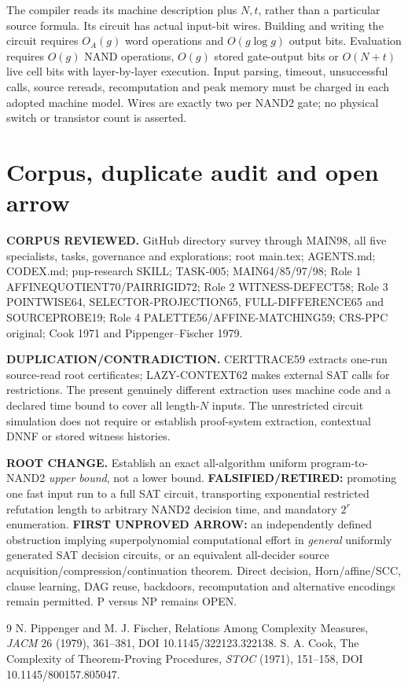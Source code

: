 \documentclass[10pt]{article}
\begin{document}
The compiler reads its machine description plus $N,t$, rather than a particular source formula. Its circuit has actual input-bit wires. Building and writing the circuit requires $O_A(g)$ word operations and $O(g\log g)$ output bits. Evaluation requires $O(g)$ NAND operations, $O(g)$ stored gate-output bits or $O(N+t)$ live cell bits with layer-by-layer execution. Input parsing, timeout, unsuccessful calls, source rereads, recomputation and peak memory must be charged in each adopted machine model. Wires are exactly two per NAND2 gate; no physical switch or transistor count is asserted.

\section{Corpus, duplicate audit and open arrow}
\noindent\textbf{CORPUS REVIEWED.} GitHub directory survey through MAIN98, all five specialists, tasks, governance and explorations; root main.tex; AGENTS.md; CODEX.md; pnp-research SKILL; TASK-005; MAIN64/85/97/98; Role 1 AFFINEQUOTIENT70/PAIRRIGID72; Role 2 WITNESS-DEFECT58; Role 3 POINTWISE64, SELECTOR-PROJECTION65, FULL-DIFFERENCE65 and SOURCEPROBE19; Role 4 PALETTE56/AFFINE-MATCHING59; CRS-PPC original; Cook 1971 and Pippenger--Fischer 1979.

\noindent\textbf{DUPLICATION/CONTRADICTION.} CERTTRACE59 extracts one-run source-read root certificates; LAZY-CONTEXT62 makes external SAT calls for restrictions. The present genuinely different extraction uses machine code and a declared time bound to cover all length-$N$ inputs. The unrestricted circuit simulation does not require or establish proof-system extraction, contextual DNNF or stored witness histories.

\noindent\textbf{ROOT CHANGE.} Establish an exact all-algorithm uniform program-to-NAND2 \emph{upper bound}, not a lower bound. \textbf{FALSIFIED/RETIRED:} promoting one fast input run to a full SAT circuit, transporting exponential restricted refutation length to arbitrary NAND2 decision time, and mandatory $2^r$ enumeration. \textbf{FIRST UNPROVED ARROW:} an independently defined obstruction implying superpolynomial computational effort in \emph{general} uniformly generated SAT decision circuits, or an equivalent all-decider source acquisition/compression/continuation theorem. Direct decision, Horn/affine/SCC, clause learning, DAG reuse, backdoors, recomputation and alternative encodings remain permitted. P versus NP remains OPEN.

\begin{thebibliography}{9}
 N. Pippenger and M. J. Fischer, Relations Among Complexity Measures, \emph{JACM} 26 (1979), 361--381, DOI 10.1145/322123.322138.
 S. A. Cook, The Complexity of Theorem-Proving Procedures, \emph{STOC} (1971), 151--158, DOI 10.1145/800157.805047.
\end{thebibliography}
\end{document}
